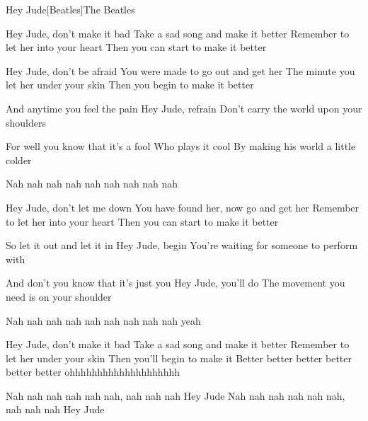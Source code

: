 \documentclass[a4paper,11pt,french]{article}
\begin{document}

\begin{Song}{Hey Jude}[Beatles]{The Beatles}
\begin{multicols}{2}

\begin{Verse}
Hey Jude, don't make it bad
Take a sad song and make it better
Remember to let her into your heart
Then you can start to make it better
\espaceInterStrophe

Hey Jude, don't be afraid
You were made to go out and get her
The minute you let her under your skin
Then you begin to make it better
\end{Verse}
\espaceInterStrophe

\begin{Chorus}
And anytime you feel the pain
Hey Jude, refrain
Don't carry the world upon your shoulders
\espaceInterStrophe

For well you know that it's a fool 
Who plays it cool
By making his world a little colder
\espaceInterStrophe

Nah nah nah nah nah nah nah nah nah
\end{Chorus}
\espaceInterStrophe

\begin{Verse}
Hey Jude, don't let me down
You have found her, now go and get her
Remember to let her into your heart
Then you can start to make it better
\end{Verse}
\espaceInterStrophe

\begin{Chorus}
So let it out and let it in
Hey Jude, begin
You're waiting for someone to perform with
\espaceInterStrophe

And don't you know that it's just you
Hey Jude, you'll do
The movement you need is on your shoulder
\espaceInterStrophe

Nah nah nah nah nah nah nah nah nah yeah
\end{Chorus}
\espaceInterStrophe

\begin{Verse}
Hey Jude, don't make it bad
Take a sad song and make it better
Remember to let her under your skin
Then you'll begin to make it
Better better better better better better
ohhhhhhhhhhhhhhhhhhhh
\end{Verse}
\espaceInterStrophe

\begin{Chorus}
Nah nah nah nah nah nah, nah nah nah
Hey Jude
Nah nah nah nah nah nah, nah nah nah
Hey Jude
\adlib
\end{Chorus}
\vfill
~
\end{multicols}


\end{Song}
\end{document}
